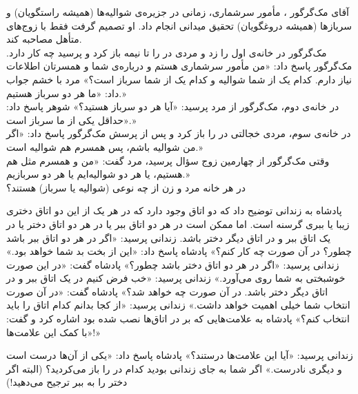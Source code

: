 \begin{problem} \label{loprmcgregor}
	آقای مک‌گرگور%
	، مأمور سرشماری، زمانی در جزیره‌ی شوالیه‌ها (همیشه راستگویان) و سرباز‌ها (همیشه دروغگویان)%
	تحقیق میدانی انجام داد. او تصمیم گرفت فقط با زوج‌های متأهل مصاحبه کند. \\
	مک‌گرگور در خانه‌ی اول را زد و مردی در را تا نیمه باز کرد و پرسید چه کار دارد. مک‌گرگور پاسخ داد: «من مأمور سرشماری هستم و درباره‌ی شما و همسرتان اطلاعات نیاز دارم. کدام یک از شما شوالیه و کدام یک از شما سرباز است؟» مرد با خشم جواب داد: «ما هر دو سرباز هستیم.» \\
	در خانه‌ی دوم، مک‌گرگور از مرد پرسید: «آیا هر دو سرباز هستید؟» شوهر پاسخ داد: «حداقل یکی از ما سرباز است.» \\
	در خانه‌ی سوم، مردی خجالتی در را باز کرد و پس از پرسش مک‌گرگور پاسخ داد: «اگر من شوالیه باشم، پس همسرم هم شوالیه است.» \\
	وقتی مک‌گرگور از چهارمین زوج سؤال پرسید، مرد گفت: «من و همسرم مثل هم هستیم، یا هر دو شوالیه‌ایم یا هر دو سربازیم.» \\
	در هر خانه مرد و زن از چه نوعی (شوالیه یا سرباز) هستند؟
\end{problem}

\begin{problem} \label{loprladytiger}
	پادشاه به زندانی توضیح داد که دو اتاق وجود دارد که در هر یک از این دو اتاق دختری زیبا یا ببری گرسنه است. اما ممکن است در هر دو اتاق ببر یا در هر دو اتاق دختر یا در یک اتاق ببر و در اتاق  دیگر دختر باشد.
	زندانی پرسید: «اگر در هر دو اتاق ببر باشد چطور؟ در آن صورت چه کار کنم؟»
	پادشاه پاسخ داد: «این از بخت بد شما خواهد بود.»
	زندانی پرسید: «اگر در هر دو اتاق دختر باشد چطور؟»
	پادشاه گفت: «در این صورت خوشبختی به شما روی می‌آورد.»
	زندانی پرسید: «خب فرض کنیم در یک اتاق ببر و در اتاق دیگر دختر باشد. در آن صورت چه خواهد شد؟»
	پادشاه گفت: «در آن صورت انتخاب شما خیلی اهمیت خواهد داشت.»
	زندانی پرسید: «از کجا بدانم کدام اتاق را باید انتخاب کنم؟»
	پادشاه به علامت‌هایی که بر در اتاق‌ها نصب شده بود اشاره کرد و گفت: «با کمک این علامت‌ها!»
	\begin{center}
	\end{center}
	زندانی پرسید: «آیا این علامت‌ها درستند؟»
	پادشاه پاسخ داد: «یکی از آن‌ها درست است و دیگری نادرست.»
	اگر شما به جای زندانی بودید کدام در را باز می‌کردید؟ (البته اگر دختر را به ببر ترجیح می‌دهید!)
\end{problem}

